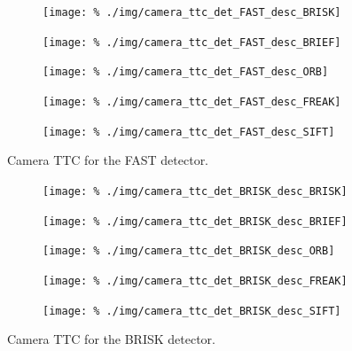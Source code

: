 \documentclass[a4paper]{scrartcl}
\begin{document}
\begin{figure}
	\centering
	\begin{subfigure}[c]{0.45\columnwidth}
		\texttt{[image: \%
			./img/camera\_ttc\_det\_FAST\_desc\_BRISK]}
	\end{subfigure}
	\begin{subfigure}[c]{0.45\columnwidth}
		\texttt{[image: \%
			./img/camera\_ttc\_det\_FAST\_desc\_BRIEF]}
	\end{subfigure}
	\begin{subfigure}[c]{0.45\columnwidth}
		\texttt{[image: \%
			./img/camera\_ttc\_det\_FAST\_desc\_ORB]}
	\end{subfigure}
	\begin{subfigure}[c]{0.45\columnwidth}
		\texttt{[image: \%
			./img/camera\_ttc\_det\_FAST\_desc\_FREAK]}
	\end{subfigure}
	\begin{subfigure}[c]{0.45\columnwidth}
		\texttt{[image: \%
			./img/camera\_ttc\_det\_FAST\_desc\_SIFT]}
	\end{subfigure}
	\caption{Camera TTC for the FAST detector.}
	\label{fig:camera:ttc:detector_FAST}
\end{figure}

\begin{figure}
	\centering
	\begin{subfigure}[c]{0.45\columnwidth}
		\texttt{[image: \%
			./img/camera\_ttc\_det\_BRISK\_desc\_BRISK]}
	\end{subfigure}
	\begin{subfigure}[c]{0.45\columnwidth}
		\texttt{[image: \%
			./img/camera\_ttc\_det\_BRISK\_desc\_BRIEF]}
	\end{subfigure}
	\begin{subfigure}[c]{0.45\columnwidth}
		\texttt{[image: \%
			./img/camera\_ttc\_det\_BRISK\_desc\_ORB]}
	\end{subfigure}
	\begin{subfigure}[c]{0.45\columnwidth}
		\texttt{[image: \%
			./img/camera\_ttc\_det\_BRISK\_desc\_FREAK]}
	\end{subfigure}
	\begin{subfigure}[c]{0.45\columnwidth}
		\texttt{[image: \%
			./img/camera\_ttc\_det\_BRISK\_desc\_SIFT]}
	\end{subfigure}
	\caption{Camera TTC for the BRISK detector.}
	\label{fig:camera:ttc:detector_BRISK}
\end{figure}
\end{document}
